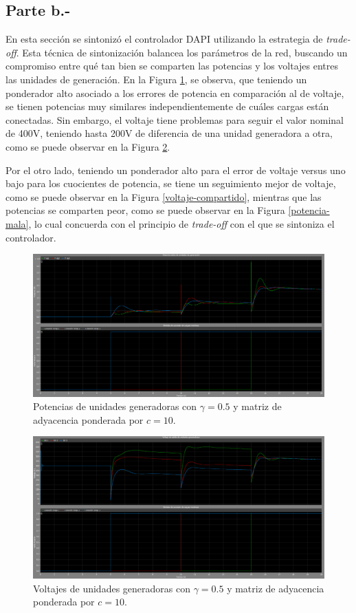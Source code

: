 \subsection{Parte b.-}

En esta sección se sintonizó el controlador DAPI utilizando la estrategia de \textit{trade-off}. Esta técnica de sintonización balancea los parámetros de la red, buscando un compromiso entre qué tan bien se comparten las potencias y los voltajes entres las unidades de generación. En la Figura \ref{potencia-compartida}, se observa, que teniendo un ponderador alto asociado a los errores de potencia en comparación al de voltaje, se tienen potencias muy similares independientemente de cuáles cargas están conectadas. Sin embargo, el voltaje tiene problemas para seguir el valor nominal de 400V, teniendo hasta 200V de diferencia de una unidad generadora a otra, como se puede observar en la Figura \ref{voltaje-malo}.

Por el otro lado, teniendo un ponderador alto para el error de voltaje versus uno bajo para los cuocientes de potencia, se tiene un seguimiento mejor de voltaje, como se puede observar en la Figura \ref{voltaje-compartido}, mientras que las potencias se comparten peor, como se puede observar en la Figura \ref{potencia-mala}, lo cual concuerda con el principio de \textit{trade-off} con el que se sintoniza el controlador. 
 
\begin{figure}
    \centering
    \includegraphics[width=0.5\linewidth]{Tarea 2/report/imagenes/p2b/potencia-compartida.png}
    \caption{Potencias de unidades generadoras con $\gamma = 0.5$ y matriz de adyacencia ponderada por $c = 10$.}
    \label{potencia-compartida}
\end{figure}

\begin{figure}
    \centering
    \includegraphics[width=0.5\linewidth]{Tarea 2/report/imagenes/p2b/voltaje-malo.png}
    \caption{Voltajes de unidades generadoras con $\gamma = 0.5$ y matriz de adyacencia ponderada por $c = 10$.}
    \label{voltaje-malo}
\end{figure}

